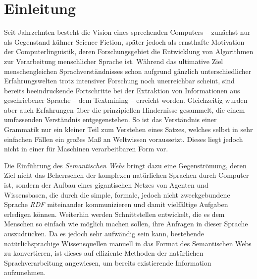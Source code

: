 \chapter*{Einleitung}

Seit Jahrzehnten besteht die Vision eines sprechenden Computers -- zunächst nur als Gegenstand kühner Science Fiction, später jedoch als ernsthafte Motivation der Computerlinguistik,
deren Forschungsgebiet die Entwicklung von Algorithmen zur Verarbeitung menschlicher Sprache ist. 
Während das ultimative Ziel menschengleichen Sprachverständnisses schon aufgrund gänzlich unterschiedlicher Erfahrungswelten trotz intensiver Forschung noch unerreichbar scheint, sind bereits beeindruckende
Fortschritte bei der Extraktion von Informationen aus geschriebener Sprache -- dem Textmining -- erreicht worden.
Gleichzeitig wurden aber auch Erfahrungen über die prinzipiellen Hindernisse gesammelt, die einem umfassenden Verständnis entgegenstehen.
So ist das Verständnis einer Grammatik nur ein kleiner Teil zum Verstehen eines Satzes, welches selbst in sehr einfachen Fällen ein großes Maß an Weltwissen voraussetzt.
Dieses liegt jedoch nicht in einer für Maschinen verarbeitbaren Form vor.

Die Einführung des \emph{Semantischen Webs} bringt dazu eine Gegenströmung, deren Ziel nicht das Beherrschen der komplexen natürlichen Sprachen durch Computer ist,
 sondern der Aufbau eines gigantischen Netzes von Agenten und Wissensbasen, die durch die simple, formale, jedoch nicht zweckgebundene Sprache \emph{RDF} miteinander kommunizieren und damit vielfältige Aufgaben erledigen können.
Weiterhin werden Schnittstellen entwickelt, die es dem Menschen so einfach wie möglich machen sollen, ihre Anfragen in dieser Sprache auszudrücken.
Da es jedoch sehr aufwändig sein kann, bestehende natürlichsprachige Wissensquellen manuell in das Format des Semantischen Webs zu konvertieren,
 ist dieses auf effiziente Methoden der natürlichen Sprachverarbeitung angewiesen, um bereits existierende Information aufzunehmen.

